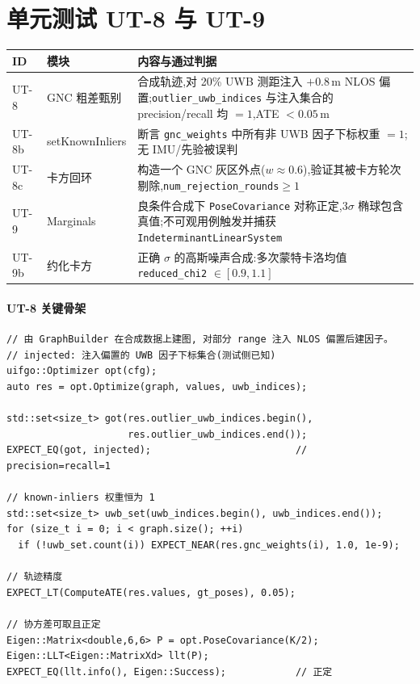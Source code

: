\documentclass[11pt,a4paper]{report}
\begin{document}
\section{单元测试 UT-8 与 UT-9}
\begin{longtable}{l p{3.9cm} p{6.3cm}}
\toprule
ID & 模块 & 内容与通过判据 \\
\midrule
UT-8  & GNC 粗差甄别 & 合成轨迹,对 20\% UWB 测距注入 $+0.8$\,m NLOS 偏置;\texttt{outlier\_uwb\_indices} 与注入集合的 precision/recall 均 $=1$,ATE $<0.05$\,m \\
UT-8b & setKnownInliers & 断言 \texttt{gnc\_weights} 中所有非 UWB 因子下标权重 $=1$;无 IMU/先验被误判 \\
UT-8c & 卡方回环 & 构造一个 GNC 灰区外点($w\!\approx\!0.6$),验证其被卡方轮次剔除,\texttt{num\_rejection\_rounds}$\ge 1$ \\
UT-9  & Marginals & 良条件合成下 \texttt{PoseCovariance} 对称正定,$3\sigma$ 椭球包含真值;不可观用例触发并捕获 \texttt{IndeterminantLinearSystem} \\
UT-9b & 约化卡方 & 正确 $\sigma$ 的高斯噪声合成:多次蒙特卡洛均值 \texttt{reduced\_chi2} $\in[0.9,1.1]$ \\
\bottomrule
\end{longtable}

\paragraph{UT-8 关键骨架}
\begin{lstlisting}[style=cpp]
// 由 GraphBuilder 在合成数据上建图, 对部分 range 注入 NLOS 偏置后建因子。
// injected: 注入偏置的 UWB 因子下标集合(测试侧已知)
uifgo::Optimizer opt(cfg);
auto res = opt.Optimize(graph, values, uwb_indices);

std::set<size_t> got(res.outlier_uwb_indices.begin(),
                     res.outlier_uwb_indices.end());
EXPECT_EQ(got, injected);                         // precision=recall=1

// known-inliers 权重恒为 1
std::set<size_t> uwb_set(uwb_indices.begin(), uwb_indices.end());
for (size_t i = 0; i < graph.size(); ++i)
  if (!uwb_set.count(i)) EXPECT_NEAR(res.gnc_weights(i), 1.0, 1e-9);

// 轨迹精度
EXPECT_LT(ComputeATE(res.values, gt_poses), 0.05);

// 协方差可取且正定
Eigen::Matrix<double,6,6> P = opt.PoseCovariance(K/2);
Eigen::LLT<Eigen::MatrixXd> llt(P);
EXPECT_EQ(llt.info(), Eigen::Success);            // 正定
\end{lstlisting}
\end{document}
